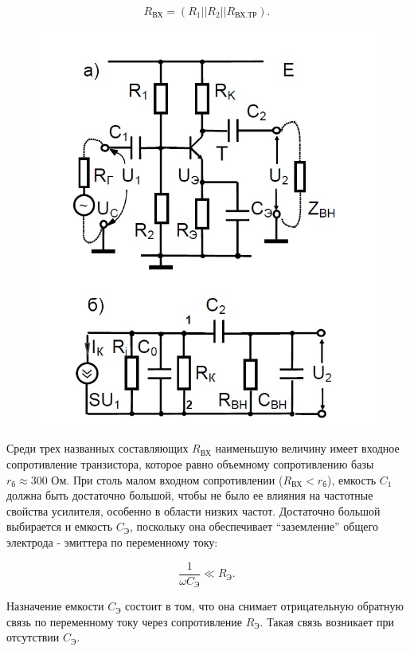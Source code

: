 $$R_{\text{ВХ}}=(R_1||R_2||R_{\text{ВХ.ТР}}).$$

\begin{figure}[h]
	\centering
	\includegraphics[width=0.6\linewidth]{fig/fig4}
	\caption{}
	\label{fig:4}
\end{figure}

Среди трех названных составляющих $R_{\text{ВХ}}$ наименьшую величину имеет входное сопротивление транзистора, которое равно объемному сопротивлению базы $r_{\text{б}}\approx 300\text{ Ом}$. При столь малом входном сопротивлении ($R_{\text{ВХ}}<r_{\text{б}}$), емкость $C_1$ должна быть достаточно большой, чтобы не было ее влияния на частотные свойства усилителя, особенно в области низких частот. Достаточно большой выбирается и емкость $C_{\text{Э}}$, поскольку она обеспечивает “заземление” общего электрода - эмиттера по переменному току:

\begin{equation}
	\frac{1}{\omega C_{\text{Э}}}\ll R_{\text{Э}}.
	\label{eq:2}
\end{equation}

Назначение емкости $C_{\text{Э}}$ состоит в том, что она снимает отрицательную обратную связь по переменному току через сопротивление $R_{\text{Э}}$. Такая связь возникает при отсутствии $C_{\text{Э}}$.


